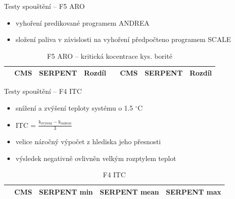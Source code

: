 \documentclass{beamer}
\begin{document}
\begin{frame}{Testy spouštění -- F5 ARO}

\begin{itemize}\footnotesize
	\item vyhoření predikované programem ANDREA
	\item složení paliva v závislosti na vyhoření předpočteno programem SCALE 
\end{itemize}

\begin{table}[h]\scriptsize
	\begin{center}
		\begin{tabular}{cccc|cccc}
			\toprule
			& CMS     & SERPENT & Rozdíl & & CMS & SERPENT & Rozdíl \\
			\midrule
			
			\bottomrule
		\end{tabular}
		\caption{\footnotesize F5 ARO -- kritická kocentrace kys. borité}
	\end{center}
\end{table}
\end{frame}

\begin{frame}{Testy spouštění -- F4 ITC}

\begin{itemize}\footnotesize
	\item snížení a zvýšení teploty systému o 1.5 $^\circ$C
\large	\item ITC =  $\frac{\textrm{k}_{\textrm{zvýšení}}-\textrm{k}_{\textrm{snížení}}}{
\textrm{3}}$

\footnotesize	\item velice náročný výpočet z hlediska jeho přesnosti
\item výsledek negativně ovlivněn velkým rozptylem teplot
\end{itemize}

\begin{table}[h]\scriptsize
	\begin{center}
		\begin{tabular}{ccccc}
			\toprule
			& CMS     & SERPENT \tiny min & SERPENT \tiny mean & SERPENT \tiny max\\
			\midrule
			
			\bottomrule
		\end{tabular}
		\caption{\footnotesize F4 ITC}
	\end{center}
\end{table}

\end{frame}
\end{document}

